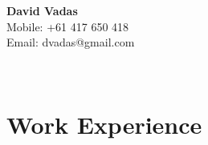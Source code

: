 \documentclass[]{article}
\begin{document}
\hrulefill
\begin{center}
\Huge{\textbf{David Vadas}}\\
\vspace{0.5cm}
\normalsize
Mobile: +61 417 650 418\\
Email: dvadas@gmail.com\\ %
\end{center}
\hrulefill
\\
\vspace{0.08in}

\section*{Work Experience}
\setlength{\tabcolsep}{0.1cm}
\end{document}
